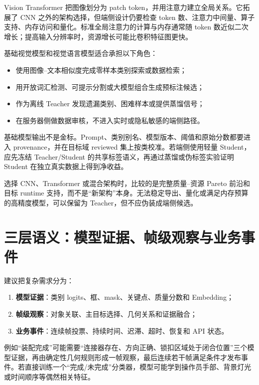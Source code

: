Vision Transformer 把图像划分为 patch token，并用注意力建立全局关系\cite{vision-transformer}。它拓展了 CNN 之外的架构选择，但端侧设计仍要检查 token 数、注意力中间量、算子支持、内存访问和量化。标准全局注意力的计算与内存通常随 token 数近似二次增长；提高输入分辨率时，资源增长可能比卷积特征图更快。

基础视觉模型和视觉语言模型适合承担以下角色：

\begin{itemize}
  \item 使用图像--文本相似度完成零样本类别探索或数据检索\cite{clip}；
  \item 用开放词汇检测、可提示分割或大模型组合生成预标注候选\cite{segment-anything}；
  \item 作为离线 Teacher 发现遗漏类别、困难样本或提供蒸馏信号；
  \item 在服务器侧做数据审核，不进入实时或隐私敏感的端侧路径。
\end{itemize}

基础模型输出不是金标。Prompt、类别别名、模型版本、阈值和原始分数都要进入 provenance，并在目标域 reviewed 集上按类校准。若端侧使用轻量 Student，应先冻结 Teacher/Student 的共享标签语义，再通过蒸馏或伪标签实验证明 Student 在独立真实数据上得到净收益。

选择 CNN、Transformer 或混合架构时，比较的是完整质量--资源 Pareto 前沿和目标 runtime 支持，而不是“新架构”本身。无法稳定导出、量化或满足内存预算的高精度模型，可以保留为 Teacher，但不应伪装成端侧候选。

\section{三层语义：模型证据、帧级观察与业务事件}

建议把复杂需求分为：

\begin{enumerate}
  \item \textbf{模型证据}：类别 logits、框、mask、关键点、质量分数和 Embedding；
  \item \textbf{帧级观察}：对象关联、主目标选择、几何关系和证据融合；
  \item \textbf{业务事件}：连续帧投票、持续时间、迟滞、超时、恢复和 API 状态。
\end{enumerate}

例如“装配完成”可能需要“连接器存在、方向正确、锁扣区域处于闭合位置”三个模型证据，再由确定性几何规则形成一帧观察，最后连续若干帧满足条件才发布事件。若直接训练一个“完成/未完成”分类器，模型可能学到操作员手部、背景灯光或时间顺序等偶然相关特征。

